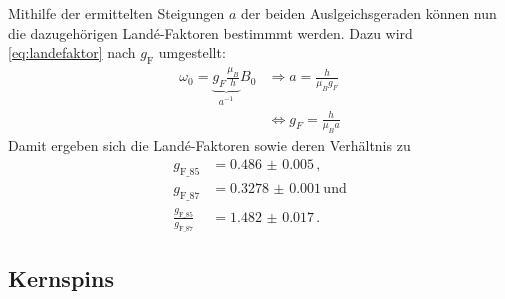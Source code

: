 Mithilfe der ermittelten Steigungen $a$ der beiden Auslgeichsgeraden können nun
die dazugehörigen Landé-Faktoren bestimmmt werden.
Dazu wird \autoref{eq:landefaktor} nach $g_\text{F}$ umgestellt:
\begin{equation*}
    \begin{aligned}
    \omega_0=\underbrace{g_F \frac{\mu_B}{h}}_{a^{-1}} B_0 & \Rightarrow a=\frac{h}{\mu_B g_F} \\
    & \Leftrightarrow g_F=\frac{h}{\mu_B a}
    \end{aligned}
\end{equation*}
Damit ergeben sich die Landé-Faktoren sowie deren Verhältnis zu
\begin{equation*}
    \begin{aligned}
        g_\text{F_85} &= \num{0.486(5)} \, , \\
        g_\text{F_87} &= \num{0.3278(10)} \, \text{und} \\
        \frac{g_\text{F_{85}}}{g_\text{F_{87}}} &= \num{1.482(17)} \, .  
    \end{aligned}
\end{equation*}

\subsection{Kernspins}
